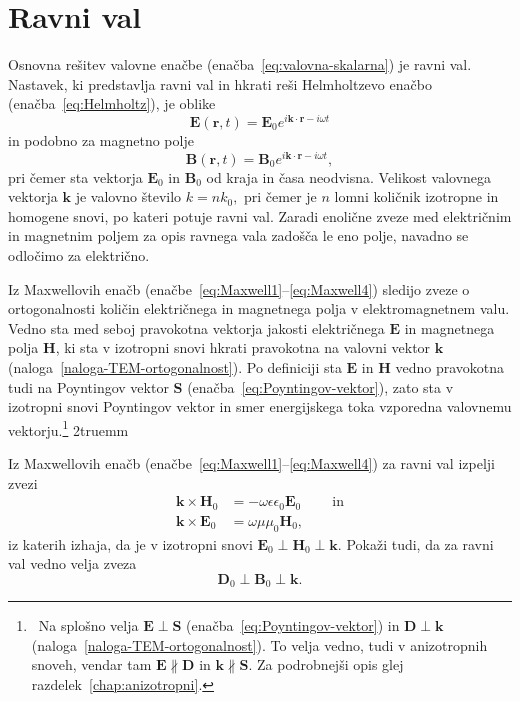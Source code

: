 \section{Ravni val}
Osnovna rešitev valovne enačbe (enačba~\ref{eq:valovna-skalarna}) je ravni 
val. Nastavek, ki predstavlja ravni val in hkrati reši 
Helmholtzevo enačbo (enačba~\ref{eq:Helmholtz}), je oblike
\begin{equation}
\mathbf{E}(\mathbf{r},t) =
\mathbf{E}_{0}e^{i\mathbf{k}\cdot\mathbf{r}-i \omega t}
\end{equation}
in podobno za magnetno polje
\begin{equation}
 \mathbf{B}(\mathbf{r},t) =
\mathbf{B}_{0}e^{i\mathbf{k}\cdot\mathbf{r}-i \omega t},
\end{equation}
pri čemer sta vektorja $\mathbf{E}_{0}$ in $\mathbf{B}_{0}$ od kraja in časa neodvisna. 
Velikost valovnega vektorja $\mathbf{k}$ je valovno število $k=nk_{0},$ 
pri čemer je $n$ lomni količnik izotropne in homogene snovi, po kateri potuje ravni val.
Zaradi enolične zveze med električnim in magnetnim poljem 
za opis ravnega vala zadošča le eno polje, navadno se odločimo za električno.

Iz Maxwellovih enačb (enačbe~\ref{eq:Maxwell1}--\ref{eq:Maxwell4}) sledijo zveze o ortogonalnosti
količin električnega in magnetnega polja v elektromagnetnem valu. Vedno sta med seboj pravokotna vektorja
jakosti električnega $\mathbf{E}$ in magnetnega polja $\mathbf{H}$, ki sta v izotropni snovi
hkrati pravokotna na valovni vektor $\mathbf{k}$ (naloga~\ref{naloga-TEM-ortogonalnost}).
Po definiciji sta $\mathbf{E}$ in $\mathbf{H}$ vedno pravokotna tudi na Poyntingov vektor $\mathbf{S}$ 
(enačba~\ref{eq:Poyntingov-vektor}), zato sta v izotropni snovi
Poyntingov vektor in smer energijskega toka vzporedna valovnemu vektorju.\footnote{~Na splošno 
velja $\mathbf{E}\perp\mathbf{S}$ (enačba~\ref{eq:Poyntingov-vektor}) in 
$\mathbf{D}\perp\mathbf{k}$ (naloga~\ref{naloga-TEM-ortogonalnost}). 
To velja vedno, tudi v anizotropnih snoveh, vendar tam $\mathbf{E} \nparallel 
\mathbf{D}$ in $\mathbf k\nparallel\mathbf S$. Za podrobnejši opis glej 
razdelek~\ref{chap:anizotropni}.} 
\vglue2truemm
\begin{definition}
\label{naloga-TEM-ortogonalnost}
Iz Maxwellovih enačb (enačbe~\ref{eq:Maxwell1}--\ref{eq:Maxwell4}) za ravni val izpelji zvezi
\begin{align}
\mathbf{k}\times\mathbf{H}_{0} & =-\omega\epsilon\epsilon_{0}\mathbf{E}_{0}\label{eq:TEM-pogoj1}\
\qquad \mathrm{in}\\
\mathbf{k}\times\mathbf{E}_{0} & =\omega\mu\mu_{0}\mathbf{H}_{0}\label{eq:TEM-pogoj2},
\end{align}
iz katerih izhaja, da je v izotropni snovi $\mathbf{E}_0\perp \mathbf{H}_0\perp 
\mathbf{k}$.
Pokaži tudi, da za ravni val vedno velja zveza
\begin{equation}
\mathbf{D}_0 \perp \mathbf{B}_0 \perp \mathbf{k}.  
\end{equation}
\end{definition}

